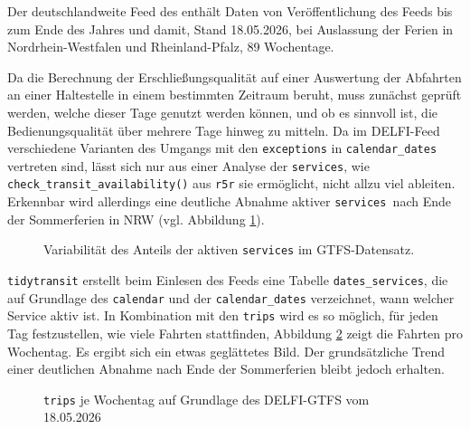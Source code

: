\documentclass[11pt,pdftex,a4paper]{scrartcl}
\begin{document}
	Der deutschlandweite Feed des \textcite{delfie.v.DeutschlandweiteSollFahrplandatenGTFS2026} enthält Daten von Veröffentlichung des Feeds bis zum Ende des Jahres und damit, Stand 18.05.2026, bei Auslassung der Ferien in Nordrhein-Westfalen und Rheinland-Pfalz, \num{89} Wochentage.
	
	Da die Berechnung der Erschließungsqualität auf einer Auswertung der Abfahrten an einer Haltestelle in einem bestimmten Zeitraum beruht, muss zunächst geprüft werden, welche dieser Tage genutzt werden können, und ob es sinnvoll ist, die Bedienungsqualität über mehrere Tage hinweg zu mitteln.	Da im DELFI-Feed verschiedene Varianten des Umgangs mit den \texttt{exceptions} in \texttt{calendar\_dates} vertreten sind, lässt sich nur aus einer Analyse der \texttt{services}, wie \texttt{check\_transit\_availability()} aus \texttt{r5r} sie ermöglicht, nicht allzu viel ableiten. Erkennbar wird allerdings eine deutliche Abnahme aktiver \texttt{services }nach Ende der Sommerferien in NRW (vgl. Abbildung \ref{fig:activeservicesyearrollavg2026-05-18}).
	
	\begin{figure}[ht]
		\centering
			
			\caption[Variabilität des Anteils der aktiven \texttt{services}]{Variabilität des Anteils der aktiven \texttt{services} im GTFS-Datensatz.}
			\label{fig:activeservicesyearrollavg2026-05-18}
	\end{figure}
	
	\texttt{tidytransit} erstellt beim Einlesen des Feeds eine Tabelle \texttt{dates\_services}, die auf Grundlage des \texttt{calendar} und der \texttt{calendar\_dates} verzeichnet, wann welcher Service aktiv ist. In Kombination mit den \texttt{trips} wird es so möglich, für jeden Tag festzustellen, wie viele Fahrten stattfinden, Abbildung \ref{fig:tripsyearrollavg2026-05-18} zeigt die Fahrten pro Wochentag. Es ergibt sich ein etwas geglättetes Bild. Der grundsätzliche Trend einer deutlichen Abnahme nach Ende der Sommerferien bleibt jedoch erhalten.
		
	\begin{figure}[ht]
		\centering
		\caption{\texttt{trips} je Wochentag auf Grundlage des DELFI-GTFS vom 18.05.2026}
		
		\label{fig:tripsyearrollavg2026-05-18}
	\end{figure}
	
\end{document}
